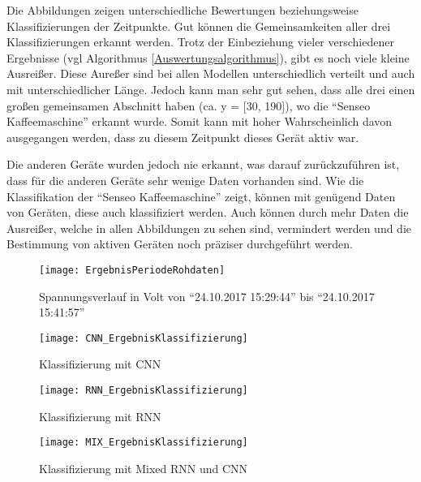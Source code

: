         \noindent
        Die Abbildungen zeigen unterschiedliche Bewertungen beziehungsweise Klassifizierungen der Zeitpunkte.
        Gut können die Gemeinsamkeiten aller drei Klassifizierungen erkannt werden.
        Trotz der Einbeziehung vieler verschiedener Ergebnisse (vgl Algorithmus \ref{Auswertungsalgorithmus}), gibt es noch viele kleine Ausreißer.
        Diese Aureßer sind bei allen Modellen unterschiedlich verteilt und auch mit unterschiedlicher Länge.
        Jedoch kann man sehr gut sehen, dass alle drei einen großen gemeinsamen Abschnitt haben (ca. y = [30, 190]), wo die "`Senseo Kaffeemaschine"' erkannt wurde.
        Somit kann mit hoher Wahrscheinlich davon ausgegangen werden, dass zu diesem Zeitpunkt dieses Gerät aktiv war.
        \newline

        \noindent
        Die anderen Geräte wurden jedoch nie erkannt, was darauf zurückzuführen ist, dass für die anderen Geräte sehr wenige Daten vorhanden sind.
        Wie die Klassifikation der "`Senseo Kaffeemaschine"' zeigt, können mit genügend Daten von Geräten, diese auch klassifiziert werden.
        Auch können durch mehr Daten die Ausreißer, welche in allen Abbildungen zu sehen sind, vermindert werden und die Bestimmung von aktiven Geräten noch präziser durchgeführt werden.      
        
        \begin{figure}[H]
            \centering
            \texttt{[image: ErgebnisPeriodeRohdaten]}
            \caption{Spannungsverlauf in Volt von "`24.10.2017 15:29:44"' bis "`24.10.2017 15:41:57"'}
            \label{fig:ResultClassificationPeriod}
        \end{figure}

        \begin{figure}[H]
            \centering
            \texttt{[image: CNN\_ErgebnisKlassifizierung]}
            \caption{Klassifizierung mit CNN}
            \label{fig:CNN_RawClassification}
        \end{figure}

        \begin{figure}[H]
            \centering
            \texttt{[image: RNN\_ErgebnisKlassifizierung]}
            \caption{Klassifizierung mit RNN}
            \label{fig:RNN_RawClassification}
        \end{figure}

        \begin{figure}[H]
            \centering
            \texttt{[image: MIX\_ErgebnisKlassifizierung]}
            \caption{Klassifizierung mit Mixed RNN und CNN}
            \label{fig:MIX_RawClassification}
        \end{figure}

